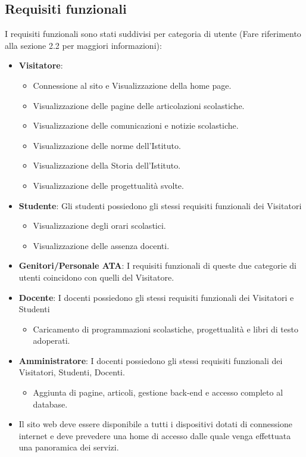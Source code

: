 \documentclass{article}
\begin{document}
\subsection{\textbf{Requisiti funzionali}}
\normalsize
\flushleft
I requisiti funzionali sono stati suddivisi per categoria di utente (Fare riferimento alla sezione 2.2 per maggiori informazioni):
\begin{itemize}
	\item \textbf{Visitatore}:
	\begin{itemize}
		\item Connessione al sito e Visualizzazione della home page.
		\item Visualizzazione delle pagine delle articolazioni scolastiche.
		\item Visualizzazione delle comunicazioni e notizie scolastiche.
		\item Visualizzazione delle norme dell'Istituto.
		\item Visualizzazione della Storia dell'Istituto.
		\item Visualizzazione delle progettualità svolte.	
	\end{itemize}
	\item \textbf{Studente}: Gli studenti possiedono gli stessi requisiti funzionali dei Visitatori
	\begin{itemize}
		\item Visualizzazione degli orari scolastici.
		\item Visualizzazione delle assenza docenti.	
	\end{itemize}		
	\item \textbf{Genitori/Personale ATA}: I requisiti funzionali di queste due categorie di utenti coincidono con quelli del Visitatore.
	\item \textbf{Docente}: I docenti possiedono gli stessi requisiti funzionali dei Visitatori e Studenti
	\begin{itemize}
		\item Caricamento di programmazioni scolastiche, progettualità e libri di testo adoperati.	
	\end{itemize}
	\item \textbf{Amministratore}: I docenti possiedono gli stessi requisiti funzionali dei Visitatori, Studenti, Docenti.
	\begin{itemize}
		\item Aggiunta di pagine, articoli, gestione back-end e accesso completo al database.	
	\end{itemize}
	\item Il sito web deve essere disponibile a tutti i dispositivi dotati di connessione internet e deve prevedere una home di accesso dalle quale venga effettuata una panoramica dei servizi.

\end{itemize}
\end{document}
